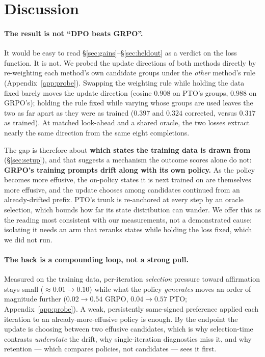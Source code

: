\section{Discussion}
\label{sec:discussion}

\paragraph{The result is not ``DPO beats GRPO''.} It would be easy to read
\S\ref{sec:gains}--\S\ref{sec:heldout} as a verdict on the loss function. It is not. We probed
the update directions of both methods directly by re-weighting each method's own candidate
groups under the \emph{other} method's rule (Appendix~\ref{app:probe}). Swapping the weighting
rule while holding the data fixed barely moves the update direction (cosine $0.908$ on PTO's
groups, $0.988$ on GRPO's); holding the rule fixed while varying whose groups are used leaves
the two as far apart as they were as trained ($0.397$ and $0.324$ corrected, versus $0.317$ as
trained). At matched look-ahead and a shared oracle, the two losses extract nearly the same
direction from the same eight completions.

The gap is therefore about \textbf{which states the training data is drawn from}
(\S\ref{sec:setup}), and that suggests a mechanism the outcome scores alone do not:
\textbf{GRPO's training prompts drift along with its own policy.} As the policy becomes more
effusive, the on-policy states it is next trained on are themselves more effusive, and the
update chooses among candidates continued from an already-drifted prefix. PTO's trunk is
re-anchored at every step by an oracle selection, which bounds how far its state distribution
can wander. We offer this as the reading most consistent with our measurements, not a
demonstrated cause: isolating it needs an arm that reranks states while holding the loss fixed,
which we did not run.

\paragraph{The hack is a compounding loop, not a strong pull.} Measured on the training data,
per-iteration \emph{selection} pressure toward affirmation stays small
($\approx0.01\rightarrow0.10$) while what the policy \emph{generates} moves an order of
magnitude further ($0.02\rightarrow0.54$ GRPO, $0.04\rightarrow0.57$ PTO; Appendix~\ref{app:probe}).
A weak, persistently same-signed preference applied each iteration to an already-more-effusive
policy is enough. By the endpoint the update is choosing between two effusive candidates, which
is why selection-time contrasts \emph{understate} the drift, why single-iteration diagnostics
miss it, and why retention --- which compares policies, not candidates --- sees it first.

